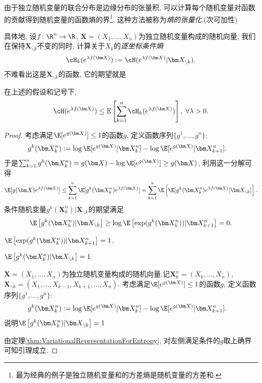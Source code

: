 由于独立随机变量的联合分布是边缘分布的张量积, 可以计算每个随机变量对函数的贡献得到随机变量的函数熵的界\footnote{最为经典的例子是独立随机变量和的方差熵是随机变量的方差和.}, 这种方法被称为\emph{熵的张量化}.(次可加性)


具体地, 设$f \colon \R^n \to \R$, $\bm X = (X_1, \dots, X_n)$为独立随机变量构成的随机向量, 我们在保持$\bm X_{\backslash k}$不变的同时, 计算关于$X_k$的\emph{逐坐标条件熵}
\begin{equation*}
	\cH_k ( e^{\lambda f(\bm X)} )
	:= \cH ( e^{\lambda f(\bm X)} | \bm X_{\backslash k} ). 
\end{equation*}
不难看出这是$\bm X_{\backslash k}$的函数, 它的期望就是

\begin{lemma}[熵的张量化]\label{lemma:EntropyTensorization}
	在上述的假设和记号下, 
	\begin{equation*}
		\cH(e^{\lambda f(\bm X)})
		\leq \mathbb{E}\left[ \sum_{k=1}^n \cH_k (e^{\lambda f(\bm X)}) \right],\; 
		\forall \lambda > 0. 
	\end{equation*}
\end{lemma}
\begin{proof}
	考虑满足$\E[e^{g(\bm X)}] \leq 1$的函数$g$, 定义函数序列$\{g^1, \dots, g^n\}$: 
	\begin{align*}
		g^k(\bm X_k^n) &:= \log \E[e^{g(\bm X)} | \bm X_k^n] - \log \E[e^{g(\bm X)} | \bm X_{k+1}^n]. 
	\end{align*}
	于是$\sum_{k=1}^n g^k(\bm X_k^n) = g(\bm X) - \log \E[ e^{g(\bm X)} ] \geq g(\bm X)$, 利用这一分解可得
	\begin{equation*}
		\E [ g(\bm X) e^{\lambda f(\bm X)}]
		\leq \sum_{k=1}^n \E[ g^k(\bm X_k^n) e^{\lambda f(\bm X)} ] 
		= \sum_{k=1}^n \E \left[ \E[ g^k(\bm X_k^n) e^{\lambda f(\bm X)} | \bm X_{\backslash k} ] \right]. 
	\end{equation*}
	条件随机变量$g^k(\bm X_k^n)| \bm X_{\backslash k}$的期望满足
	\begin{equation*}
		\E \left[ g^k(\bm X_k^n) | \bm X_{\backslash k} \right]
		\geq \log \E \left[ \exp(g^k(\bm X_k^n)) |\bm X_{k+1}^n \right] = 0. 
	\end{equation*}
	
	$\E \left[ \exp(g^k(\bm X_k^n)) |\bm X_{k+1}^n \right] = 1$. 
	
	$\E \left[ g^k(\bm X_k^n) | \bm X_{\backslash k} \right] = 1$
	
	\sp 
	$\bm X = (X_1, \dots, X_n)$为独立随机变量构成的随机向量,记$\bm X_k^n = (X_k, \dots, X_n)$, $\bm X_{\backslash k} = (X_1, \dots, X_{k-1}, X_{k+1}, \dots, X_n)$. 
	考虑满足$\E[e^{g(\bm X)}] \leq 1$的函数$g$, 定义函数序列$\{g^1, \dots, g^n\}$: 
	\begin{align*}
		g^k(\bm X_k^n) &:= \log \E[e^{g(\bm X)} | \bm X_k^n] - \log \E[e^{g(\bm X)} | \bm X_{k+1}^n]. 
	\end{align*}
	说明$\E \left[ g^k(\bm X_k^n) | \bm X_{\backslash k} \right] =1$
	
	由定理\ref{thm:VariationalRepresentationForEntropy}, 对左侧满足条件的$g$取上确界可知引理成立. 
\end{proof}

